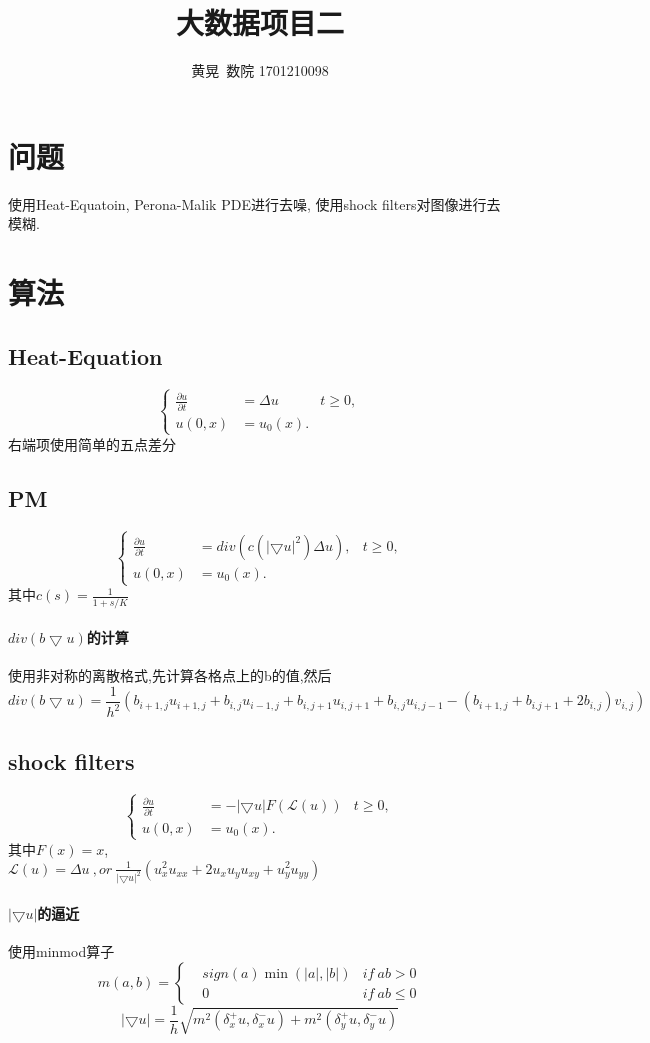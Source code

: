 \documentclass[UTF8]{ctexart}
\author{黄晃\ 数院 1701210098 }
\title{大数据项目二}
\begin{document}
  \maketitle
\section{问题}
使用Heat-Equatoin, Perona-Malik PDE进行去噪, 使用shock filters对图像进行去模糊.
  \section{算法}
\subsection{Heat-Equation}
$$ \left\{
\begin{aligned}
\frac{\partial u}{\partial t}&= \Delta u & t \geq 0, \\
u(0,x)& = u_0(x). &
\end{aligned}
\right.
$$
右端项使用简单的五点差分
\subsection{PM}
$$ \left\{
\begin{aligned}
\frac{\partial u}{\partial t}&= div(c(|\bigtriangledown u|^2) \Delta u), & t \geq 0, \\
u(0,x)& = u_0(x). &
\end{aligned}
\right.
$$
其中$c(s)=\frac{1}{1+s/K}$
\paragraph{$div(b\bigtriangledown u)$的计算}
使用非对称的离散格式,先计算各格点上的b的值,然后
$$
div(b\bigtriangledown u)=\frac{1}{h^2}(b_{i+1,j}u_{i+1,j}+b_{i,j}u_{i-1,j}+b_{i,j+1}u_{i,j+1}+b_{i,j}u_{i,j-1}-(b_{i+1,j}+b_{i.j+1}+2b_{i,j})v_{i,j})
$$
\subsection{shock filters}
$$ \left\{
\begin{aligned}
\frac{\partial u}{\partial t}&= -|\bigtriangledown u| F(\mathscr{L}(u)) & t \geq 0, \\
u(0,x)& = u_0(x). &
\end{aligned}
\right.
$$
其中$F(x)=x$, \\
$\mathscr{L}(u)=\Delta u\ ,or\ \frac{1}{|\bigtriangledown u|^2}(u_x^2u_{xx}+2u_xu_yu_{xy}+u_y^2u_{yy})$
\paragraph{$|\bigtriangledown u|$的逼近}
使用minmod算子
$$
m(a,b)=\left\{
\begin{aligned}
&sign(a)\min (|a|,|b|) & if\ ab>0 \\
&0 & if\ ab\leq 0
\end{aligned}
\right.
$$
$$
|\bigtriangledown u| = \frac{1}{h} \sqrt{m^2(\delta^+_xu,\delta_x^-u) + m^2(\delta^+_yu,\delta_y^-u)}
$$
\end{document}
